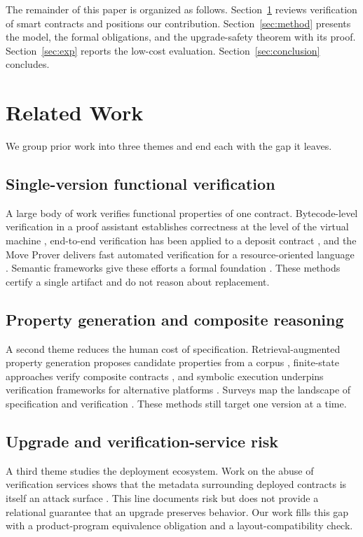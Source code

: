 \documentclass[journal]{IEEEtran}
\begin{document}
The remainder of this paper is organized as follows. Section~\ref{sec:related} reviews verification of smart contracts and positions our contribution. Section~\ref{sec:method} presents the model, the formal obligations, and the upgrade-safety theorem with its proof. Section~\ref{sec:exp} reports the low-cost evaluation. Section~\ref{sec:conclusion} concludes.

\section{Related Work}
\label{sec:related}
We group prior work into three themes and end each with the gap it leaves.

\subsection{Single-version functional verification}
A large body of work verifies functional properties of one contract. Bytecode-level verification in a proof assistant establishes correctness at the level of the virtual machine \cite{amani2018}, end-to-end verification has been applied to a deposit contract \cite{park2020}, and the Move Prover delivers fast automated verification for a resource-oriented language \cite{dill2022-move}. Semantic frameworks give these efforts a formal foundation \cite{grishchenko2018}. These methods certify a single artifact and do not reason about replacement.

\subsection{Property generation and composite reasoning}
A second theme reduces the human cost of specification. Retrieval-augmented property generation proposes candidate properties from a corpus \cite{liu2025-propertygpt}, finite-state approaches verify composite contracts \cite{almakhour2022}, and symbolic execution underpins verification frameworks for alternative platforms \cite{doan2024}. Surveys map the landscape of specification and verification \cite{tolmach2021}. These methods still target one version at a time.

\subsection{Upgrade and verification-service risk}
A third theme studies the deployment ecosystem. Work on the abuse of verification services shows that the metadata surrounding deployed contracts is itself an attack surface \cite{ma2024-abusing}. This line documents risk but does not provide a relational guarantee that an upgrade preserves behavior. Our work fills this gap with a product-program equivalence obligation and a layout-compatibility check.
\end{document}

